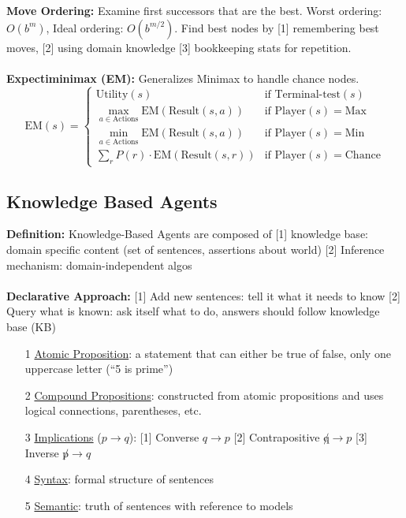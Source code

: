 \textbf{Move Ordering:} Examine first successors that are the best. Worst ordering: $O(b^m)$, Ideal ordering: $O(b^{m/2})$. Find best nodes by [1] remembering best moves, [2] using domain knowledge [3] bookkeeping stats for repetition.\\
\\
\textbf{Expectiminimax (EM):} Generalizes Minimax to handle chance nodes. 
$$
\text{EM}(s) = \begin{cases}
    \text{Utility}(s) &\text{if Terminal-test}(s)\\
    \max_{a \in \text{Actions}} \text{EM}(\text{Result}(s,a)) &\text{if Player}(s) = \text{Max}\\
    \min_{a \in \text{Actions}} \text{EM}(\text{Result}(s,a)) &\text{if Player}(s) = \text{Min}\\
    \sum_r P(r) \cdot \text{EM}(\text{Result}(s,r)) &\text{if Player}(s) = \text{Chance}
\end{cases}
$$
\subsection{Knowledge Based Agents}
\textbf{Definition:} Knowledge-Based Agents are composed of [1] knowledge base: domain specific content (set of sentences, assertions about world) [2] Inference mechanism: domain-independent algos\\
\\
\textbf{Declarative Approach:} [1] Add new sentences: tell it what it needs to know [2] Query what is known: ask itself what to do, answers should follow knowledge base (KB)
\begin{itemize}
    \item [1] \underline{Atomic Proposition}: a statement that can either be true of false, only one uppercase letter (``5 is prime'')\\
    \item [2] \underline{Compound Propositions}: constructed from atomic propositions and uses logical connections, parentheses, etc.\\
    \item [3] \underline{Implications} ($p \rightarrow q$): [1] Converse $q \rightarrow p$ [2] Contrapositive $\not q \rightarrow p$ [3] Inverse $\not p \rightarrow q$\\
    \item [4] \underline{Syntax}: formal structure of sentences\\
    \item [5] \underline{Semantic}: truth of sentences with reference to models\\
\end{itemize}
